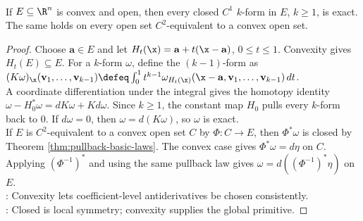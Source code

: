 \begin{theorem} \label{thm:poincare-lemma-convex-rudin} \\
If $E\subseteq\R^n$ is convex and open, then every closed $C^1$ $k$-form in $E$, $k\geq1$, is exact.\\
The same holds on every open set $C^2$-equivalent to a convex open set.
\begin{proof}
Choose $\mathbf{a}\in E$ and let $H_t(\x)=\mathbf{a}+t(\x-\mathbf{a})$, $0\leq t\leq1$. Convexity gives $H_t(E)\subseteq E$. For a $k$-form $\omega$, define the $(k-1)$-form  as $(K\omega)_{\x}(\mathbf{v}_1,\ldots,\mathbf{v}_{k-1}) \defeq \int_0^1 t^{k-1}\omega_{H_t(\x)}(\x-\mathbf{a},\mathbf{v}_1,\ldots,\mathbf{v}_{k-1})\,dt$.\\
A coordinate differentiation under the integral gives the homotopy identity $\omega-H_0^\ast\omega=dK\omega+Kd\omega$. Since $k\geq1$, the constant map $H_0$ pulls every $k$-form back to $0$. If $d\omega=0$, then $\omega=d(K\omega)$, so $\omega$ is exact.\\
If $E$ is $C^2$-equivalent to a convex open set $C$ by $\Phi:C\to E$, then $\Phi^\ast\omega$ is closed by Theorem \ref{thm:pullback-basic-laws}. The convex case gives $\Phi^\ast\omega=d\eta$ on $C$. Applying $(\Phi^{-1})^\ast$ and using the same pullback law gives $\omega=d((\Phi^{-1})^\ast\eta)$ on $E$.\\
: Convexity lets coefficient-level antiderivatives be chosen consistently.\\
: Closed is local symmetry; convexity supplies the global primitive.
\end{proof}
\end{theorem}


